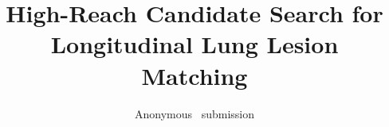 \documentclass[10pt,twocolumn,letterpaper]{article}
\title{High-Reach Candidate Search for Longitudinal Lung Lesion Matching}
\author{Anonymous \confName~submission}
\begin{document}
\maketitle








{
    \small
    
    
}

\end{document}

